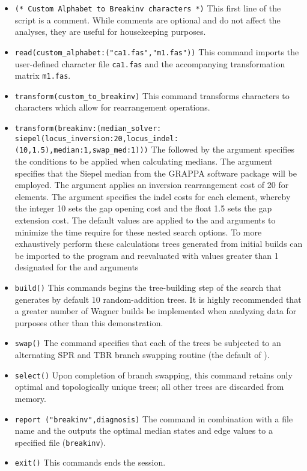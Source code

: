 \begin{itemize}
\item \texttt{(* Custom Alphabet to Breakinv characters  *)} This first line of the script is a comment. While comments are optional and do not affect the analyses, they are useful for housekeeping purposes.
\item \texttt{read(custom\_alphabet:("ca1.fas","m1.fas"))} This command imports the user-defined  character file \texttt{ca1.fas} and the accompanying transformation matrix \texttt{m1.fas}.
\item \texttt{transform(custom\_to\_breakinv)} This command transforms  characters to  characters which allow for rearrangement operations.
\item \texttt{transform(breakinv:(median\_solver: siepel(locus\_inversion:20,locus\_indel:(10,1.5),median:1,swap\_med:1)))}  The  followed by the argument  specifies the conditions to be applied when calculating medians. The argument \poyargument{[median\_solver:siepel} specifies that the Siepel median from the GRAPPA software package \cite{baderetal2002} will be employed.  The argument  applies an inversion rearrangement cost of 20 for  elements. The argument  specifies the indel costs for each  element, whereby the integer 10 sets the gap opening cost and the float 1.5 sets the gap extension cost.  The default values are applied to the  and  arguments to minimize the time require for these nested search options.   To more exhaustively perform these calculations trees generated from initial builds can be imported to the program and reevaluated with values greater than 1 designated for the  and  arguments
\item \texttt{build()} This commands begins the tree-building step of the search that generates by default 10 random-addition trees.  It is highly recommended that a greater number of Wagner builds be implemented when analyzing data for purposes other than this demonstration.
\item \texttt{swap()} The  command specifies that each of the trees be subjected to an alternating SPR and TBR branch swapping routine (the default of \poy).
\item \texttt{select()} Upon completion of branch swapping, this command retains only optimal and topologically unique trees; all other trees are discarded from memory. 
\item \texttt{report ("breakinv",diagnosis)}  The  command in combination with a file name and the  outputs the optimal median states and edge values to a specified file (\texttt{breakinv}). 
\item \texttt{exit()} This commands ends the \poy session.
\end{itemize}


